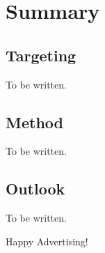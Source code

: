 %
%

\pagebreak
\section{Summary}

\onehalfspacing

\subsection{Targeting}

To be written.

\subsection{Method}

To be written.

\subsection{Outlook}

To be written.

Happy Advertising!
